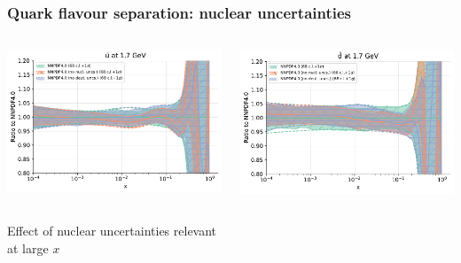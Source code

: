 \documentclass{beamer}
\begin{document}
\begin{frame}
 \frametitle{Quark flavour separation: nuclear uncertainties}
 \footnotesize
 \centering
 \begin{columns}[c]
  \begin{column}{0.5\textwidth}
   \centering
   \includegraphics[width=\columnwidth]{plots/nuclear_baru}\\
  \end{column}
  \begin{column}{0.5\textwidth}
   \centering
   \includegraphics[width=\columnwidth]{plots/nuclear_bard}\\
  \end{column}
 \end{columns}
  \begin{columns}[c]
  \begin{column}{0.5\textwidth}
   \centering
   Effect of nuclear uncertainties relevant\\ at large $x$\\

\end{column}
\end{columns}
\end{frame}
\end{document}
